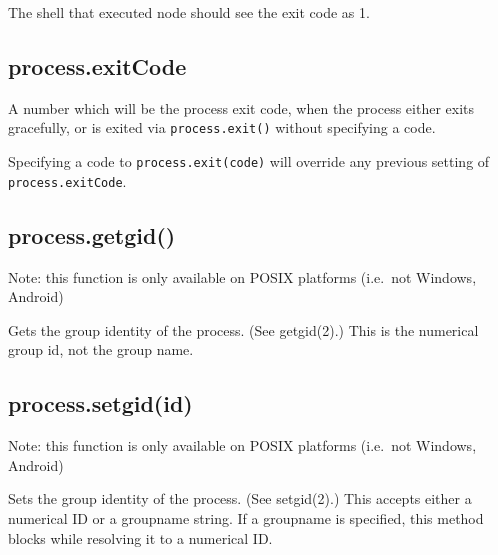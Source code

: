 \begin{Shaded}
\begin{Highlighting}[]
\NormalTok{(}\NormalTok{);}
\end{Highlighting}
\end{Shaded}

The shell that executed node should see the exit code as 1.

\subsection{process.exitCode}\label{process.exitcode-1}

A number which will be the process exit code, when the process either
exits gracefully, or is exited via \texttt{process.exit()} without
specifying a code.

Specifying a code to \texttt{process.exit(code)} will override any
previous setting of \texttt{process.exitCode}.

\subsection{process.getgid()}\label{process.getgid}

Note: this function is only available on POSIX platforms (i.e.~not
Windows, Android)

Gets the group identity of the process. (See getgid(2).) This is the
numerical group id, not the group name.

\begin{Shaded}
\begin{Highlighting}[]
 \NormalTok{(}\NormalTok{) \{}
  \NormalTok{(} \NormalTok{+ }\NormalTok{());}
\NormalTok{\}}
\end{Highlighting}
\end{Shaded}

\subsection{process.setgid(id)}\label{process.setgidid}

Note: this function is only available on POSIX platforms (i.e.~not
Windows, Android)

Sets the group identity of the process. (See setgid(2).) This accepts
either a numerical ID or a groupname string. If a groupname is
specified, this method blocks while resolving it to a numerical ID.

